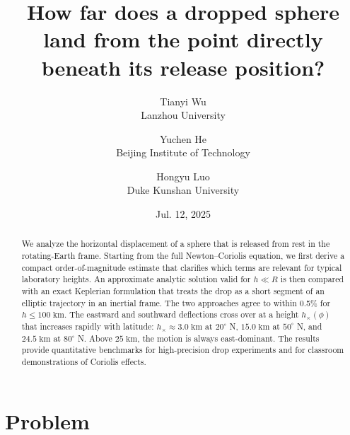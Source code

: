 \documentclass[11pt,en]{elegantpaper}
\title{How far does a dropped sphere land from the point directly beneath its release position?}
\author{Tianyi Wu \\ Lanzhou University \and Yuchen He \\ Beijing Institute of Technology \and Hongyu Luo \\ Duke Kunshan University}
\date{Jul. 12, 2025}
\begin{document}
\maketitle

\begin{abstract}
	We analyze the horizontal displacement of a sphere that is released from rest in the rotating-Earth frame.
	Starting from the full Newton–Coriolis equation, we first derive a compact order-of-magnitude estimate that clarifies which terms are relevant for typical laboratory heights.
	An approximate analytic solution valid for $h\ll R$ is then compared with an exact Keplerian formulation that treats the drop as a short segment of an elliptic trajectory in an inertial frame.
	The two approaches agree to within 0.5\% for $h \le 100\;\text{km}$.
	The eastward and southward deflections cross over at a height $h_\times(\phi)$ that increases rapidly with latitude:
	$h_\times\!\approx\!3.0\;\text{km}$ at $20^{\circ}$ N, $15.0\;\text{km}$ at $50^{\circ}$ N, and $24.5\;\text{km}$ at $80^{\circ}$ N.
	Above $25\;\text{km}$, the motion is always east-dominant.
	The results provide quantitative benchmarks for high-precision drop experiments and for classroom demonstrations of Coriolis effects.

\end{abstract}

\section{Problem}
\end{document}
